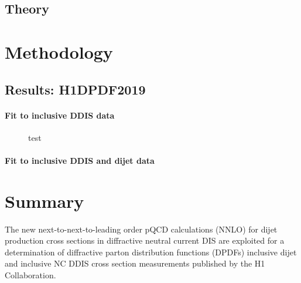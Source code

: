 \documentclass[12pt]{article}
\begin{document}
\begin{boldmath}
\section{Theory}
\end{boldmath}
\label{sec:theory}


\section{Methodology}
\label{sec:method}


\subsection{Results: H1DPDF2019}
\paragraph{Fit to inclusive DDIS data}
\label{sec:resultsIncl}


\begin{figure}[ht]
\begin{center}
\end{center}
\caption{
  test
}
\label{fig:DPDFratio}
\end{figure}






\paragraph{Fit to inclusive DDIS and dijet data}
\label{sec:resultsJets}


\section{Summary}
The new next-to-next-to-leading order pQCD calculations (NNLO) for dijet
production cross sections in diffractive neutral current DIS are exploited for a
determination of diffractive parton distribution functions (DPDFs) inclusive
dijet and inclusive NC DDIS cross section measurements published by the H1 Collaboration. 
\end{document}
